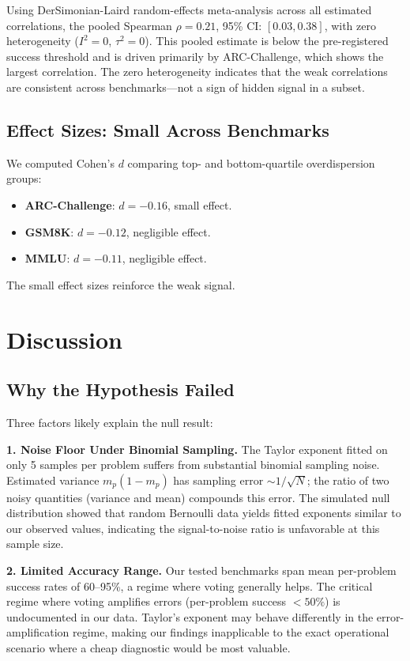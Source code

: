 \documentclass[11pt,letterpaper]{article}
\begin{document}
Using DerSimonian-Laird random-effects meta-analysis across all estimated correlations, the pooled Spearman $\rho = 0.21$, 95\% CI: $[0.03, 0.38]$, with zero heterogeneity ($I^2 = 0$, $\tau^2 = 0$). This pooled estimate is below the pre-registered success threshold and is driven primarily by ARC-Challenge, which shows the largest correlation. The zero heterogeneity indicates that the weak correlations are consistent across benchmarks---not a sign of hidden signal in a subset.

\subsection{Effect Sizes: Small Across Benchmarks}

We computed Cohen's $d$ comparing top- and bottom-quartile overdispersion groups:

\begin{itemize}
  \item \textbf{ARC-Challenge}: $d = -0.16$, small effect.
  \item \textbf{GSM8K}: $d = -0.12$, negligible effect.
  \item \textbf{MMLU}: $d = -0.11$, negligible effect.
\end{itemize}

The small effect sizes reinforce the weak signal.

\section{Discussion}

\subsection{Why the Hypothesis Failed}

Three factors likely explain the null result:

\textbf{1. Noise Floor Under Binomial Sampling.} The Taylor exponent fitted on only 5 samples per problem suffers from substantial binomial sampling noise. Estimated variance $m_p(1 - m_p)$ has sampling error $\sim 1/\sqrt{N}$; the ratio of two noisy quantities (variance and mean) compounds this error. The simulated null distribution showed that random Bernoulli data yields fitted exponents similar to our observed values, indicating the signal-to-noise ratio is unfavorable at this sample size.

\textbf{2. Limited Accuracy Range.} Our tested benchmarks span mean per-problem success rates of 60--95\%, a regime where voting generally helps. The critical regime where voting amplifies errors (per-problem success $< 50\%$) is undocumented in our data. Taylor's exponent may behave differently in the error-amplification regime, making our findings inapplicable to the exact operational scenario where a cheap diagnostic would be most valuable.
\end{document}
